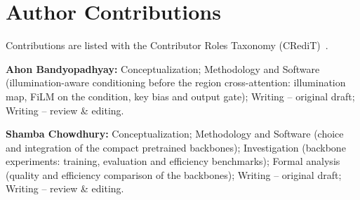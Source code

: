 \section{Author Contributions}
\label{app:contributions}

Contributions are listed with the Contributor Roles Taxonomy (CRediT)~\cite{brand2015credit}.

\smallskip
\noindent\textbf{Ahon Bandyopadhyay:}
Conceptualization;
Methodology and Software (illumination-aware conditioning before the region cross-attention:
illumination map, FiLM on the condition, key bias and output gate);
Writing -- original draft; Writing -- review \& editing.

\smallskip
\noindent\textbf{Shamba Chowdhury:}
Conceptualization;
Methodology and Software (choice and integration of the compact pretrained backbones);
Investigation (backbone experiments: training, evaluation and efficiency benchmarks);
Formal analysis (quality and efficiency comparison of the backbones);
Writing -- original draft; Writing -- review \& editing.
